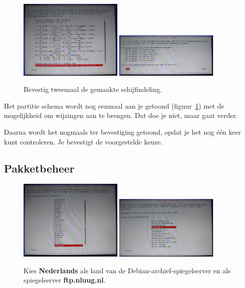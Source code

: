 \documentclass[12pt,a4paper]{article}
\begin{document}
\begin{figure}[H]
\centering
\includegraphics[width=0.45\textwidth]{schijven-overzicht-scherm}
\includegraphics[width=0.45\textwidth]{schijven-tweede-overzicht-scherm}
\caption{Bevestig tweemaal de gemaakte schijfindeling.}
\label{fig:schijven-overzicht}
\end{figure}


Het partitie schema wordt nog eenmaal aan je getoond (figuur~\ref{fig:schijven-overzicht}) met de mogelijkheid om wijzingen aan te brengen. Dat doe je niet, maar gaat verder.

Daarna wordt het nogmaals ter bevestiging getoond, opdat je het nog \'{e}\'{e}n keer kunt controleren. Je bevestigt de voorgestelde keuze.


\subsection{Pakketbeheer}

\begin{figure}[H]
\centering
\includegraphics[width=0.45\textwidth]{pakketbeheer-landkeuze-scherm}
\includegraphics[width=0.45\textwidth]{pakketbeheer-mirror-scherm}
\caption{Kies \textbf{Nederlands} als land van de Debian-archief-spiegelserver en als spiegelserver \textbf{ftp.nluug.nl}.}
\label{fig:pakketten}
\end{figure}
\end{document}
